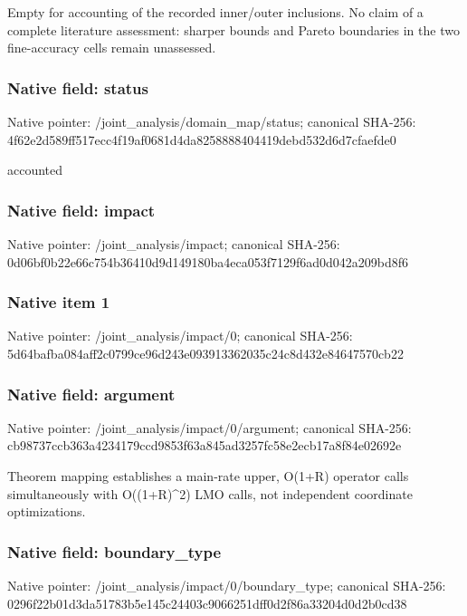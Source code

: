 \documentclass[10pt,a4paper]{article}
\begin{document}
\begingroup\raggedright\sloppy Empty for accounting of the recorded inner/\allowbreak{}outer inclusions. No claim of a complete literature assessment:\allowbreak{} sharper bounds and Pareto boundaries in the two fine-accuracy cells remain unassessed.\par\endgroup

\subsubsection{Native field: status}
Native pointer: /joint\_\allowbreak{}analysis/domain\_\allowbreak{}map/status; canonical SHA-256: 4f62e2d589ff517ecc4f19af0681d4da8258888404419debd532d6d7cfaefde0

\begingroup\raggedright\sloppy accounted\par\endgroup

\subsubsection{Native field: impact}
Native pointer: /joint\_\allowbreak{}analysis/impact; canonical SHA-256: 0d06bf0b22e66c754b36410d9d149180ba4eca053f7129f6ad0d042a209bd8f6

\subsubsection{Native item 1}
Native pointer: /joint\_\allowbreak{}analysis/impact/0; canonical SHA-256: 5d64bafba084aff2c0799ce96d243e093913362035c24c8d432e84647570cb22

\subsubsection{Native field: argument}
Native pointer: /joint\_\allowbreak{}analysis/impact/0/argument; canonical SHA-256: cb98737ccb363a4234179ccd9853f63a845ad3257fc58e2ecb17a8f84e02692e

\begingroup\raggedright\sloppy Theorem mapping establishes a main-rate upper,\allowbreak{} O(1+R) operator calls simultaneously with O((1+R)\textasciicircum{}2) LMO calls,\allowbreak{} not independent coordinate optimizations.\par\endgroup

\subsubsection{Native field: boundary\_\allowbreak{}type}
Native pointer: /joint\_\allowbreak{}analysis/impact/0/boundary\_\allowbreak{}type; canonical SHA-256: 0296f22b01d3da51783b5e145c24403c9066251dff0d2f86a33204d0d2b0cd38
\end{document}
